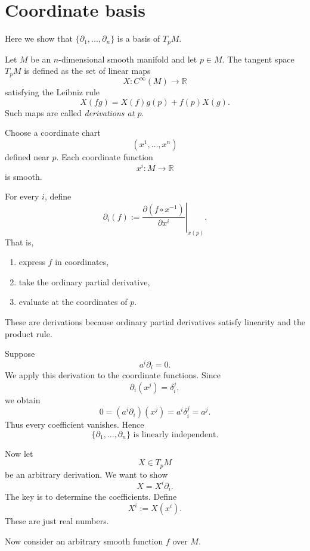 \documentclass[aps,prl,twocolumn,groupedaddress]{revtex4-2}
\begin{document}
\appendix

\section{Coordinate basis}

Here we show that $\{\partial_1,...,\partial_n\}$ is a basis of $T_pM$.


Let $M$ be an $n$-dimensional smooth manifold and let $p\in M$.
The tangent space $T_pM$ is defined as the set of linear maps
$$
X:C^\infty(M)\longrightarrow\mathbb{R}
$$
satisfying the Leibniz rule
$$
X(fg)=X(f)g(p)+f(p)X(g).
$$
Such maps are called {\em derivations at $p$}.


Choose a coordinate chart
$$
(x^1,\ldots,x^n)
$$
defined near $p$.
Each coordinate function
$$
x^i:M\longrightarrow\mathbb{R}
$$
is smooth.


For every $i$, define
$$
\boxed{
\partial_i(f)
:=
\left.
\frac{\partial(f\circ x^{-1})}{\partial x^i}
\right|_{x(p)}.
}
$$
That is,
\begin{enumerate}
\item express $f$ in coordinates,
\item take the ordinary partial derivative,
\item evaluate at the coordinates of $p$.
\end{enumerate}
These are derivations because ordinary partial derivatives satisfy linearity and the product rule.


Suppose
$$
a^i\partial_i=0.
$$
We apply this derivation to the coordinate functions.
Since
$$
\partial_i(x^j)=\delta_i^j,
$$
we obtain
$$
0
=
\left(a^i\partial_i\right)(x^j)
=
a^i\delta_i^j
=
a^j.
$$
Thus every coefficient vanishes.
Hence
$$
\boxed{
\{\partial_1,\ldots,\partial_n\}
\text{ is linearly independent.}
}
$$


Now let
$$
X\in T_pM
$$
be an arbitrary derivation.
We want to show
$$
X
=
X^i\partial_i.
$$
The key is to determine the coefficients.
Define
$$
X^i:=X(x^i).
$$
These are just real numbers.

Now consider an arbitrary smooth function $f$ over $M$.
\end{document}
